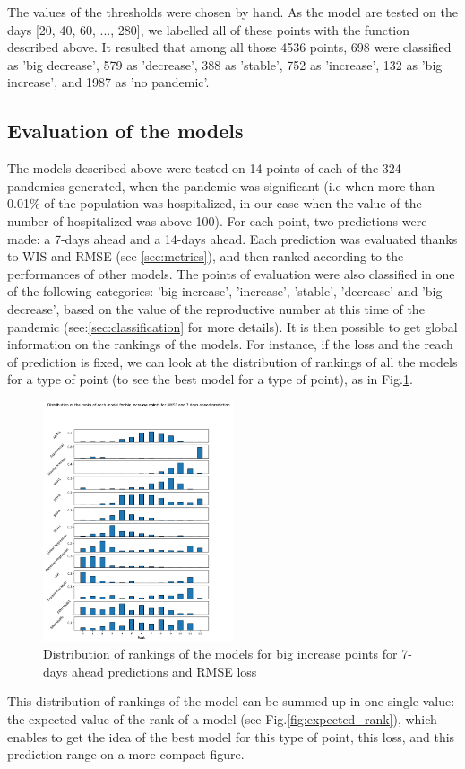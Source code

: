 The values of the thresholds were chosen by hand. 
As the model are tested on the days [20, 40, 60, ..., 280], we labelled all of these points with the function described above. 
It resulted that among all those 4536 points, 698 were classified as 'big decrease', 579 as 'decrease', 388 as 'stable', 752 as 'increase',  132 as 'big increase', and 1987 as 'no pandemic'.



\subsection{Evaluation of the models}

The models described above were tested on 14 points of each of the 324 pandemics generated, when the pandemic was significant (i.e when more than 0.01\% of the population was hospitalized, in our case when the value of the number of hospitalized was above 100). 
For each point, two  predictions were made:  a 7-days ahead and a 14-days ahead. 
Each prediction was evaluated thanks to WIS and RMSE (see \ref{sec:metrics}), and then ranked according to the performances of other models.
The points of evaluation were also classified in one of the following categories: 'big increase', 'increase', 'stable', 'decrease' and 'big decrease', based on the value of the reproductive number at this time of the pandemic (see:\ref{sec:classification} for more details). 
It is then possible to get global information on the rankings of the models. 
For instance, if the loss and the reach of prediction is fixed, we can look at the distribution of rankings of all the models for a type of point (to see the best model for a type of point), as in Fig.\ref{fig:rankings}.
\begin{figure}[h!]
    \centering
    \includegraphics[width=0.5\textwidth]{figures/ranks_big_increase_RMSE_7.png}
    \caption{Distribution of rankings of the models for big increase points for 7-days ahead predictions and RMSE loss}
    \label{fig:rankings}
\end{figure}
This distribution of rankings of the model can be summed up in one single value: the expected value of the rank of a model (see Fig.\ref{fig:expected_rank}), which enables to get the idea of the best model for this type of point, this loss, and this prediction range on a more compact figure. 

